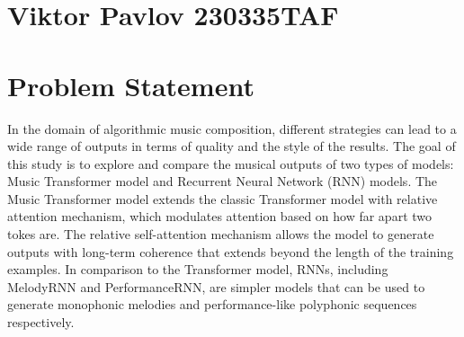 \documentclass[twocolumn]{article}
\author{Name Surname }
\begin{document}
\section*{Viktor Pavlov 230335TAF}
\section{Problem Statement}
In the domain of algorithmic music composition, different strategies can lead to a wide range of outputs in terms of quality and the style of the results. The goal of this study is to explore and compare the musical outputs of two types of models: Music Transformer model and Recurrent Neural Network (RNN) models. The Music Transformer model extends the classic Transformer model with relative attention mechanism, which modulates attention based on how far apart two tokes are. The relative self-attention mechanism allows the model to generate outputs with long-term coherence that extends beyond the length of the training examples. In comparison to the Transformer model, RNNs, including MelodyRNN and PerformanceRNN, are simpler models that can be used to generate monophonic melodies and performance-like polyphonic sequences respectively.
\end{document}
